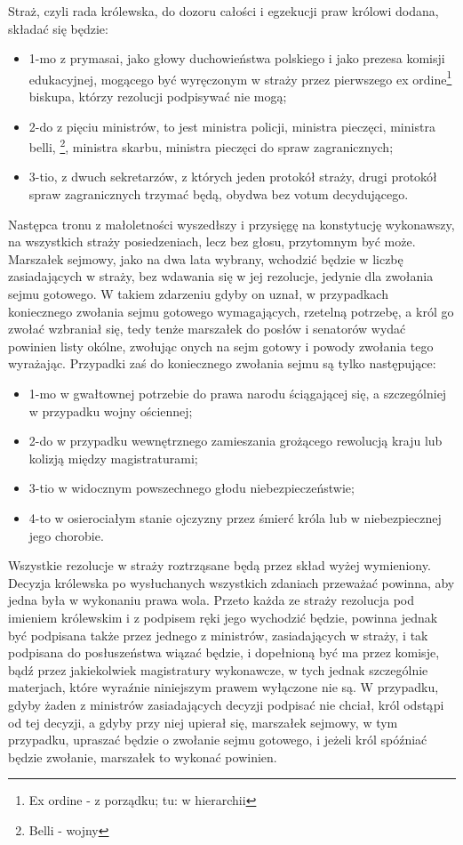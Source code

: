 \documentclass{book}
\begin{document}
 Straż, czyli rada królewska, do dozoru całości i egzekucji praw królowi dodana, składać się będzie: 
\begin{itemize}
\item 1-mo z prymasai, jako głowy duchowieństwa polskiego  i jako prezesa komisji edukacyjnej, mogącego być wyręczonym w straży przez pierwszego ex ordine\footnote{Ex ordine - z porządku; tu: w hierarchii}  biskupa, którzy rezolucji podpisywać nie mogą;  
\item 2-do z pięciu ministrów, to jest ministra policji, ministra pieczęci, ministra belli, \footnote{Belli - wojny}, ministra skarbu, ministra pieczęci do spraw zagranicznych; 
\item 3-tio, z dwuch sekretarzów, z których jeden protokół straży, drugi protokół spraw zagranicznych trzymać będą, obydwa bez votum decydującego.  
\end{itemize}
Następca tronu z małoletności wyszedłszy i przysięgę na konstytucję wykonawszy, na wszystkich straży posiedzeniach, lecz bez głosu, przytomnym być może.  Marszałek sejmowy, jako na dwa lata wybrany, wchodzić będzie w liczbę zasiadających w straży, bez wdawania się w jej rezolucje, jedynie dla zwołania sejmu gotowego. W takiem zdarzeniu gdyby on uznał, w przypadkach koniecznego zwołania sejmu gotowego wymagających, rzetelną potrzebę, a król go zwołać wzbraniał się,  tedy tenże marszałek do posłów i senatorów wydać powinien listy okólne, zwołując onych na sejm gotowy i powody zwołania tego wyrażając. Przypadki zaś do koniecznego zwołania sejmu są tylko następujące:  
\begin{itemize}
\item 1-mo w gwałtownej potrzebie do prawa narodu ściągającej się, a szczególniej w przypadku wojny ościennej; 
\item 2-do w przypadku wewnętrznego zamieszania grożącego rewolucją kraju lub kolizją między magistraturami;  
\item 3-tio w widocznym powszechnego głodu niebezpieczeństwie; 
\item 4-to w osierociałym stanie ojczyzny przez śmierć króla lub w niebezpiecznej jego chorobie. 
\end{itemize}
Wszystkie rezolucje w straży roztrząsane będą przez skład wyżej wymieniony.  Decyzja królewska po wysłuchanych wszystkich zdaniach przeważać powinna, aby jedna była w wykonaniu prawa wola.  Przeto każda ze straży rezolucja pod imieniem królewskim i z podpisem ręki jego wychodzić będzie, powinna jednak być podpisana także przez jednego z ministrów, zasiadających w straży, i tak podpisana do posłuszeństwa wiązać będzie,  i dopełnioną być ma przez komisje, bądź przez jakiekolwiek magistratury wykonawcze, w tych jednak szczególnie materjach, które wyraźnie niniejszym prawem wyłączone nie są.  W przypadku, gdyby żaden z ministrów zasiadających decyzji podpisać nie chciał, król odstąpi od tej decyzji, a gdyby przy niej upierał się, marszałek sejmowy,  w tym przypadku, upraszać będzie o zwołanie sejmu gotowego, i jeżeli król spóźniać będzie zwołanie, marszałek to wykonać powinien. 
\end{document}
